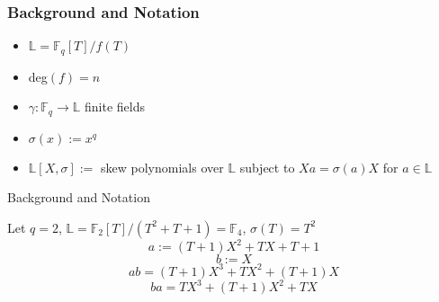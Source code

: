 \documentclass{beamer}
\newcommand{\f}{\mathbb{F}}
\begin{document}
\begin{frame}
\frametitle{Background and Notation}

\begin{itemize}

\item $\mathbb{L} = \mathbb{F}_q[T]/f(T)$
\item deg$(f) = n$
\item $\gamma: \mathbb{F}_q \to \mathbb{L}$ finite fields
\item $\sigma(x) := x^q$
\item $\mathbb{L}[X,\sigma] := $ skew polynomials over $\mathbb{L}$ subject to $Xa = \sigma(a)X$ for $a \in \mathbb{L}$ 

\end{itemize}
\end{frame}
\begin{frame}{Background and Notation}


\begin{example}
Let $q = 2$, $\mathbb{L} = \mathbb{F}_2[T]/(T^2 + T + 1) = \mathbb{F}_4$, $\sigma(T) = T^2$
\[ a:= (T + 1)X^2 + TX + T + 1 \]
\[b := X\]
\[ab = (T + 1)X^3 + TX^2 + (T + 1)X\]
\[ba = TX^3 + (T+1)X^2 + TX \]
\end{example}



\end{frame}











\end{document}
